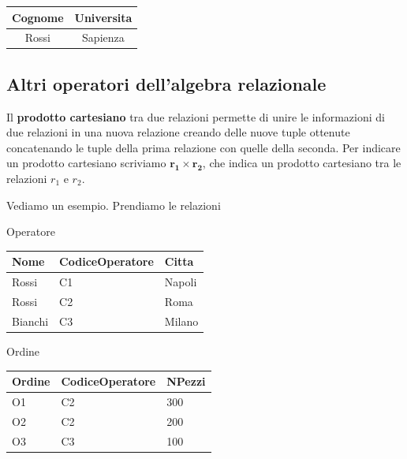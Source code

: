 \documentclass[11pt, a4paper, titlepage, oneside]{scrbook}
\begin{document}
\begin{center}
  \begin{tabular}{|c|c|}
    \hline
    \textbf{Cognome} & \textbf{Universita} \\
    \hline
     Rossi & Sapienza \\ 
    \hline
  \end{tabular}
\end{center}

\subsection{Altri operatori dell'algebra relazionale}

\begin{Definizione}
\label{def-prodotto-cartesiano}
Il \textbf{prodotto cartesiano} tra due relazioni permette di unire le informazioni di due relazioni in una nuova relazione creando delle nuove tuple ottenute concatenando le tuple della prima relazione con quelle della seconda. Per indicare un prodotto cartesiano scriviamo $\bm{r_1 \times r_2}$, che indica un prodotto cartesiano tra le relazioni $r_1$ e $r_2$. 
\end{Definizione}

Vediamo un esempio. Prendiamo le relazioni

\begin{minipage}[c]{0.45\textwidth}
\begin{center}
    Operatore

\begin{tabular}{|l|l|l|}
\hline
\textbf{Nome} & \textbf{CodiceOperatore} & \textbf{Citta} \\ \hline
Rossi & C1 & Napoli \\
Rossi & C2 & Roma \\
Bianchi & C3 & Milano \\ \hline
\end{tabular}
\end{center}
\end{minipage}\hfill
\begin{minipage}[c]{0.45\textwidth}
\begin{center}
    Ordine

\begin{tabular}{|l|l|l|}
\hline
\textbf{Ordine} & \textbf{CodiceOperatore} & \textbf{NPezzi} \\ \hline
O1 & C2 & 300 \\
O2 & C2 & 200 \\
O3 & C3 & 100 \\ \hline
\end{tabular}
\end{center}
\end{minipage}
\end{document}
